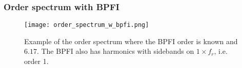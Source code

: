 \begin{frame}
    \frametitle{Order spectrum with BPFI}
    \small
    
    \begin{figure}
        \centering
        \texttt{[image: order\_spectrum\_w\_bpfi.png]}
        \caption{Example of the order spectrum where the BPFI order is known and $6.17$.  The BPFI also has harmonics with sidebands on $1\times f_r$, i.e. order 1.}
        \label{fig:order_spectrum}
    \end{figure}
   
\end{frame}

